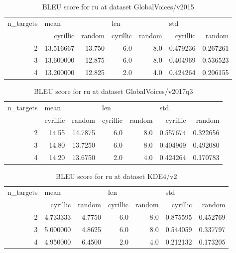 \begin{table}[h]
\begin{tabular}{rrrrrrr}
\toprule
n\_targets & \multicolumn{2}{l}{mean} & \multicolumn{2}{l}{len} & \multicolumn{2}{l}{std} \\
          &   cyrillic &  random & cyrillic & random &  cyrillic &    random \\
\midrule
        2 &  13.516667 &  13.750 &      6.0 &    8.0 &  0.479236 &  0.267261 \\
        3 &  13.600000 &  12.875 &      6.0 &    8.0 &  0.404969 &  0.536523 \\
        4 &  13.200000 &  12.825 &      2.0 &    4.0 &  0.424264 &  0.206155 \\
\bottomrule
\end{tabular}

\caption{BLEU score for  ru at dataset GlobalVoices/v2015 }
\label{ table:ru/GlobalVoices/v2015 }
\end{table}

\begin{table}[h]
\begin{tabular}{rrrrrrr}
\toprule
n\_targets & \multicolumn{2}{l}{mean} & \multicolumn{2}{l}{len} & \multicolumn{2}{l}{std} \\
          & cyrillic &   random & cyrillic & random &  cyrillic &    random \\
\midrule
        2 &    14.55 &  14.7875 &      6.0 &    8.0 &  0.557674 &  0.322656 \\
        3 &    14.80 &  13.7250 &      6.0 &    8.0 &  0.404969 &  0.492080 \\
        4 &    14.20 &  13.6750 &      2.0 &    4.0 &  0.424264 &  0.170783 \\
\bottomrule
\end{tabular}

\caption{BLEU score for  ru at dataset GlobalVoices/v2017q3 }
\label{ table:ru/GlobalVoices/v2017q3 }
\end{table}

\begin{table}[h]
\begin{tabular}{rrrrrrr}
\toprule
n\_targets & \multicolumn{2}{l}{mean} & \multicolumn{2}{l}{len} & \multicolumn{2}{l}{std} \\
          &  cyrillic &  random & cyrillic & random &  cyrillic &    random \\
\midrule
        2 &  4.733333 &  4.7750 &      6.0 &    8.0 &  0.875595 &  0.452769 \\
        3 &  5.000000 &  4.8625 &      6.0 &    8.0 &  0.544059 &  0.337797 \\
        4 &  4.950000 &  6.4500 &      2.0 &    4.0 &  0.212132 &  0.173205 \\
\bottomrule
\end{tabular}

\caption{BLEU score for  ru at dataset KDE4/v2 }
\label{ table:ru/KDE4/v2 }
\end{table}

